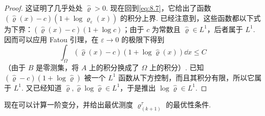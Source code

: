 \begin{proof}
这证明了几乎处处 $\widehat\varrho>0$. 现在回到\eqref{eq:8.7}，它给出了函数 $(\widehat\varrho(x)-c)(1+\log\varrho_\varepsilon(x))$ 的积分上界. 已经注意到，这些函数都以下式为下界：$(\widehat\varrho(x)-c)(1+\log c)$；由于 $c$ 为常数且 $\widehat\varrho\in L^1$，后者属于 $L^1$. 因而可以应用 Fatou 引理，在 $\varepsilon\to0$ 的极限下得到
\[
\int_\Omega(\widehat\varrho(x)-c)(1+\log\widehat\varrho(x))\dd x\leq C
\]
（由于 $B$ 是零测集，将 $A$ 上的积分换成了 $\Omega$ 上的积分）. 已知 $(\widehat\varrho-c)(1+\log\widehat\varrho)$ 被一个 $L^1$ 函数从下方控制，而且其积分有限，所以它属于 $L^1$. 又已经知道 $\widehat\varrho,\widehat\varrho\log\widehat\varrho\in L^1$，于是推出 $\log\widehat\varrho\in L^1$.
\end{proof}

现在可以计算一阶变分，并给出最优测度 $\varrho_{(k+1)}^\tau$ 的最优性条件.

